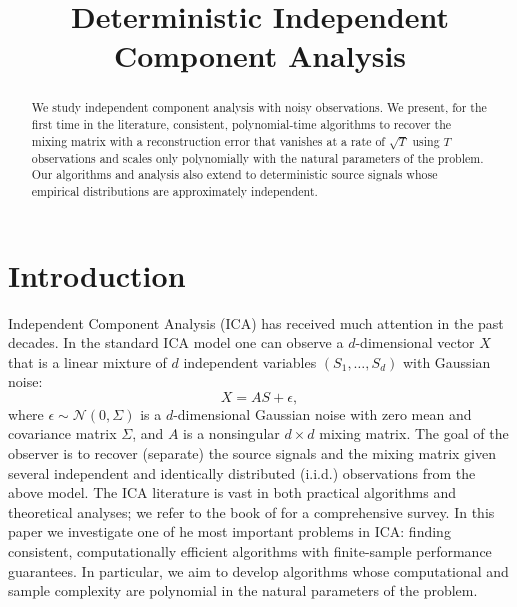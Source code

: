 \documentclass[jmlr]{article}
\title{Deterministic Independent Component Analysis}
\newcommand{\iid}{i.i.d.\xspace}
\theoremstyle{definition}
\begin{document}
 
\maketitle

\begin{abstract}
We study independent component analysis with noisy observations. 
We present, for the first time in the literature, consistent, polynomial-time algorithms to recover 
the mixing matrix with 
a reconstruction error that vanishes at a rate of $\sqrt{T}$ using $T$ observations and scales only polynomially with
the natural parameters of the problem. 
Our algorithms and analysis also extend to deterministic source signals whose empirical distributions are approximately independent.
\end{abstract}

\section{Introduction}
\label{sec:Intro}
Independent Component Analysis (ICA)
has received much attention in the past decades. 
In the standard ICA model one can observe a $d$-dimensional vector $X$ that is a linear mixture of $d$ independent variables $(S_1,\ldots, S_d)$ with Gaussian noise:
\begin{equation}
\label{eq:stoch-ICA}
X = AS+\epsilon,
\end{equation}
where $\epsilon \sim \mathcal{N}(0,\Sigma)$ is a $d$-dimensional Gaussian noise with zero mean and covariance matrix $\Sigma$, and $A$ is a nonsingular $d \times d$ mixing matrix. The goal of the observer is to recover (separate) the source signals and the mixing matrix given several independent and identically distributed (\iid) observations from the above model.
The ICA literature is vast in both practical algorithms and theoretical analyses; 
we refer to the book of \citet{comon2010handbook} for a comprehensive survey.
In this paper we investigate one of he most important problems in ICA: finding consistent, computationally efficient algorithms with finite-sample performance guarantees. In particular, we aim to develop algorithms whose computational and sample complexity are polynomial in the natural parameters of the problem.
\end{document}
